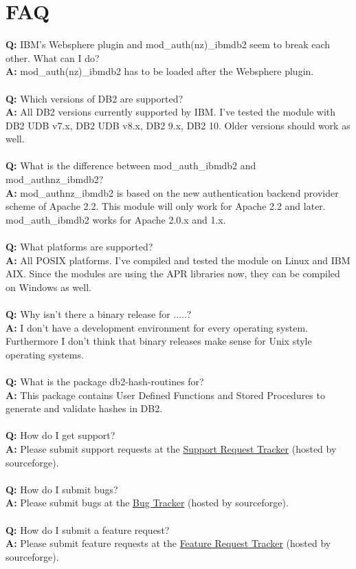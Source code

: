 \section{FAQ}
\textbf{Q:} IBM's Websphere plugin and mod\_auth(nz)\_ibmdb2 seem to break each other. What can I do? \\
\textbf{A:} mod\_auth(nz)\_ibmdb2 has to be loaded after the Websphere plugin. \\
\\
\textbf{Q:} Which versions of DB2 are supported? \\
\textbf{A:} All DB2 versions currently supported by IBM. I've tested the module with DB2 UDB v7.x, DB2 UDB v8.x, DB2 9.x, DB2 10. Older versions should work as well. \\
\\
\textbf{Q:} What is the difference between mod\_auth\_ibmdb2 and mod\_authnz\_ibmdb2? \\
\textbf{A:} mod\_authnz\_ibmdb2 is based on the new authentication backend provider scheme of Apache 2.2. This module will only work for Apache 2.2 and later. \linebreak[4] mod\_auth\_ibmdb2 works for Apache 2.0.x and 1.x. \\
\\
\textbf{Q:} What platforms are supported? \\
\textbf{A:} All POSIX platforms. I've compiled and tested the module on Linux and IBM AIX. Since the modules are using the APR libraries now, they can be compiled on Windows as well. \\
\\
\textbf{Q:} Why isn't there a binary release for .....? \\
\textbf{A:} I don't have a development environment for every operating system. Furthermore I don't think that binary releases make sense for Unix style operating systems. \\
\\
\textbf{Q:} What is the package db2-hash-routines for? \\
\textbf{A:} This package contains User Defined Functions and Stored Procedures to generate and validate hashes in DB2. \\
\\
\textbf{Q:} How do I get support? \\
\textbf{A:} Please submit support requests at the \href{http://sf.net/p/mod-auth-ibmdb2/support-requests}{Support Request Tracker} (hosted by sourceforge). \\
\\
\textbf{Q:} How do I submit bugs? \\
\textbf{A:} Please submit bugs at the \href{http://sf.net/p/mod-auth-ibmdb2/bugs}{Bug Tracker} (hosted by sourceforge). \\
\\
\textbf{Q:} How do I submit a feature request? \\
\textbf{A:} Please submit feature requests at the \href{http://sf.net/p/mod-auth-ibmdb2/feature-requests}{Feature Request Tracker} (hosted by sourceforge).
